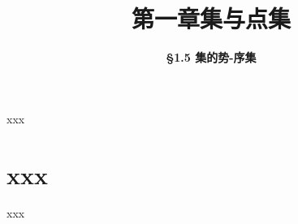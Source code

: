 


\title[第一章\\
集与点集]{\texorpdfstring{\LARGE \bfseries 第一章\quad 集与点集}{第一章 集与点集}} %
\author[\S 1.5\\
集的势-序集] %
{\Large \bfseries \S 1.5 集的势-序集}
\date{}





\begin{frame}

\titlepage %

\end{frame}





\begin{frame}{xxx}



\end{frame}


\section{xxx}


\begin{frame}{xxx}


\end{frame}



